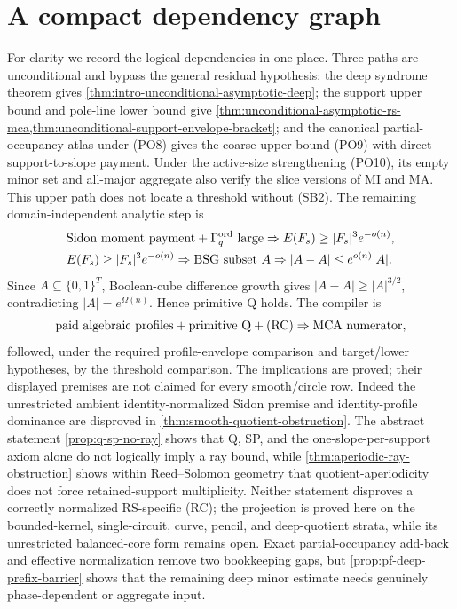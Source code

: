 \documentclass[12pt,a4paper]{amsart}
\numberwithin{equation}{section}
\theoremstyle{remark}
\newcommand{\Gord}{\Gamma^{\rm ord}}
\newcommand{\abs}[1]{\lvert #1\rvert}
\begin{document}
\section{A compact dependency graph}\label{sec:dependency-graph}

For clarity we record the logical dependencies in one place.  Three paths
are unconditional and bypass the general residual hypothesis: the deep
syndrome theorem gives
\cref{thm:intro-unconditional-asymptotic-deep}; the support upper bound
and pole-line lower bound give
\cref{thm:unconditional-asymptotic-rs-mca,thm:unconditional-support-envelope-bracket};
and the canonical partial-occupancy atlas under \textup{(PO8)} gives the
coarse upper bound \textup{(PO9)} with direct support-to-slope payment.
Under the active-size strengthening \textup{(PO10)}, its empty minor set
and all-major aggregate also verify the slice versions of MI and MA.  This upper path does not
locate a threshold without \textup{(SB2)}.  The remaining
domain-independent analytic step is
\[
\begin{aligned}
&\text{Sidon moment payment}+\Gord_q\text{ large}
 \Rightarrow E(F_s)\ge \abs{F_s}^3e^{-o(n)},\\
&E(F_s)\ge \abs{F_s}^3e^{-o(n)}
 \Rightarrow \text{BSG subset }A
 \Rightarrow \abs{A-A}\le e^{o(n)}\abs A.
\end{aligned}
\]
Since \(A\subseteq\{0,1\}^T\), Boolean-cube difference growth gives
\(\abs{A-A}\ge\abs A^{3/2}\), contradicting
\(\abs A=e^{\Omega(n)}\).  Hence primitive Q holds.  The compiler is
\[
 \text{paid algebraic profiles}+\text{primitive Q}+\textup{(RC)}
 \Rightarrow \text{MCA numerator},
\]
followed, under the required profile-envelope comparison and target/lower
hypotheses, by the
threshold comparison.  The implications are proved; their displayed
premises are not claimed for every smooth/circle row.  Indeed the
unrestricted ambient identity-normalized Sidon premise and
identity-profile dominance are disproved in
\cref{thm:smooth-quotient-obstruction}.  The abstract statement
\cref{prop:q-sp-no-ray} shows that Q, SP, and the one-slope-per-support
axiom alone do not logically imply a ray bound, while
\cref{thm:aperiodic-ray-obstruction} shows within Reed--Solomon geometry
that quotient-aperiodicity does not force retained-support multiplicity.
Neither statement disproves a correctly normalized RS-specific
\textup{(RC)}; the projection is proved here on the bounded-kernel,
single-circuit, curve, pencil, and deep-quotient strata, while its
unrestricted balanced-core form remains open.  Exact
partial-occupancy add-back and effective normalization
remove two bookkeeping gaps, but \cref{prop:pf-deep-prefix-barrier}
shows that the remaining deep minor estimate needs genuinely
phase-dependent or aggregate input.
\end{document}
